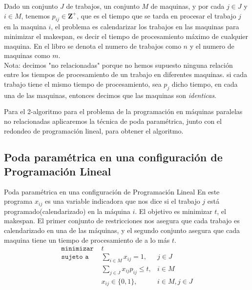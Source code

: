\begin{frame}{\subsectiontitle}
Dado un conjunto $J$ de trabajos, un conjunto $M$ de maquinas, y por cada $j\in J$ y $i\in M$, tenemos $p_{ij}\in \mathbf{Z}^+$, que es el tiempo que se tarda en procesar el trabajo $j$ en la maquina $i$, el problema es calendarizar los trabajos en las maquinas para minimizar el makespan, es decir el tiempo de procesamiento máximo de cualquier maquina. En el libro se denota el numero de trabajos como $n$ y el numero de maquinas como $m$.\\

Nota: decimos "no relacionadas" porque no hemos supuesto ninguna relación entre los tiempos de procesamiento de un trabajo en diferentes maquinas. si cada trabajo tiene el mismo tiempo de procesamiento, sea $p_j$ dicho tiempo, en cada una de las maquinas, entonces decimos que las maquinas son \textit{identicas}.
\end{frame}

\begin{frame}{\subsectiontitle}
Para el 2-algoritmo para el problema de la programación en máquinas paralelas no relacionadas aplicaremos la técnica de poda paramétrica, junto con el redondeo de programación lineal, para obtener el algoritmo.
\end{frame}

\renewcommand{\subsectiontitle}{Poda paramétrica en una configuración de Programación Lineal}
\subsection{\subsectiontitle}

\begin{frame}{\subsectiontitle}
En este programa $x_{ij}$ es una variable indicadora que nos dice si el trabajo $j$ está programado(calendarizado) en la máquina $i$. El objetivo es minimizar $t$, el makespan. El primer conjunto de restricciones nos asegura que cada trabajo es calendarizado en una de las máquinas, y el segundo conjunto asegura que cada maquina tiene un tiempo de procesamiento de a lo más $t$.
\begin{align*}
    \texttt{minimizar } &t &\\
    \texttt{sujeto a } &\sum_{i\in M}x_{ij}=1, &j \in J\\
    &\sum_{j\in J}x_{ij}p_{ij}\leq t, &i \in M\\
    &x_{ij}\in \{0,1\}, &i \in M,j \in J\\
\end{align*}
\end{frame}

